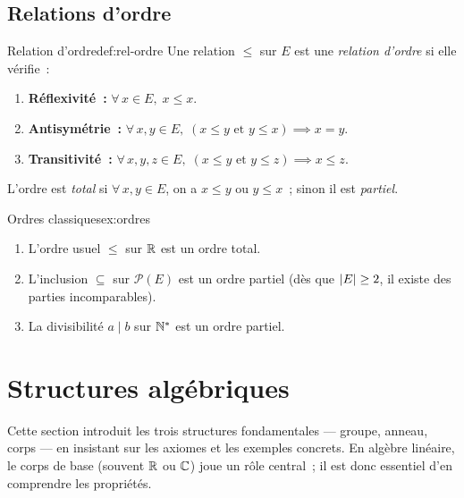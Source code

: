 \subsection{Relations d'ordre}\label{subsec:ordre}

\begin{definition}{Relation d'ordre}{def:rel-ordre}
  Une relation $\leq$ sur $E$ est une \emph{relation d'ordre}%
   si elle vérifie~:
  \begin{enumerate}[label=(\roman*)]
    \item \textbf{Réflexivité~:} $\forall\, x\in E,\; x\leq x$.
    \item \textbf{Antisymétrie~:} $\forall\, x,y\in E,\;
      (x\leq y\text{ et }y\leq x)\implies x=y$.
    \item \textbf{Transitivité~:} $\forall\, x,y,z\in E,\;
      (x\leq y\text{ et }y\leq z)\implies x\leq z$.
  \end{enumerate}
  L'ordre est \emph{total} si $\forall\, x,y\in E$, on a $x\leq y$ ou
  $y\leq x$~; sinon il est \emph{partiel}.
\end{definition}

\begin{example}{Ordres classiques}{ex:ordres}
  \begin{enumerate}[label=(\alph*)]
    \item L'ordre usuel $\leq$ sur ${\mathbb{R}}$ est un ordre total.
    \item L'inclusion $\subseteq$ sur $\mathcal{P}(E)$ est un ordre
      partiel (dès que $\left|E\right|\geq 2$, il existe des parties
      incomparables).
    \item La divisibilité $a\mid b$ sur ${\mathbb{N}}^*$ est un ordre partiel.
  \end{enumerate}
\end{example}

\section{Structures algébriques}\label{sec:structures}

Cette section introduit les trois structures fondamentales --- groupe,
anneau, corps --- en insistant sur les axiomes et les exemples concrets.
En algèbre linéaire, le corps de base (souvent ${\mathbb{R}}$ ou ${\mathbb{C}}$) joue un
rôle central~; il est donc essentiel d'en comprendre les propriétés.

